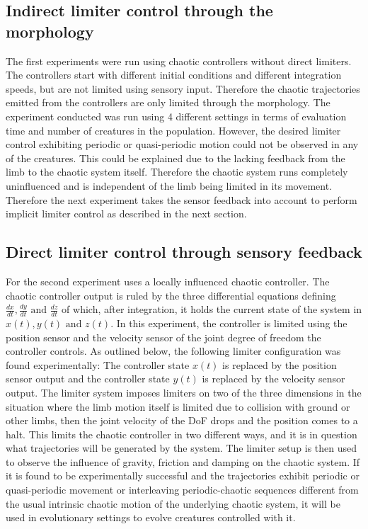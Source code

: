 \documentclass[main]{subfiles}
\begin{document}
\subsection{Indirect limiter control through the morphology}

The first experiments were run using chaotic controllers without direct limiters. The controllers start with different initial conditions and different integration speeds, but are not limited using sensory input. Therefore the chaotic trajectories emitted from the controllers are only limited through the morphology. The experiment conducted was run using 4 different settings in terms of evaluation time and number of creatures in the population. However, the desired limiter control exhibiting periodic or quasi-periodic motion could not be observed in any of the creatures. This could be explained due to the lacking feedback from the limb to the chaotic system itself. Therefore the chaotic system runs completely uninfluenced and is independent of the limb being limited in its movement. Therefore the next experiment takes the sensor feedback into account to perform implicit limiter control as described in the next section.

\subsection{Direct limiter control through sensory feedback}

For the second experiment uses a locally influenced chaotic controller. The chaotic controller output is ruled by the three differential equations defining \(\frac{dx}{dt},\frac{dy}{dt} \text{ and } \frac{dz}{dt}\) of which, after integration, it holds the current state of the system in \(x(t),y(t) \text{ and } z(t)\).  In this experiment, the controller is limited using the position sensor and the velocity sensor of the joint degree of freedom the controller controls. As outlined below, the following limiter configuration was found experimentally: The controller state \(x(t)\) is replaced by the position sensor output and the controller state \(y(t)\) is replaced by the velocity sensor output. The limiter system imposes limiters on two of the three dimensions in the situation where the limb motion itself is limited due to collision with ground or other limbs, then the joint velocity of the DoF drops and the position comes to a halt. This limits the chaotic controller in two different ways, and it is in question what trajectories will be generated by the system. The limiter setup is then used to observe the influence of gravity, friction and damping on the chaotic system. If it is found to be experimentally successful and the trajectories exhibit periodic or quasi-periodic movement or interleaving periodic-chaotic sequences different from the usual intrinsic chaotic motion of the underlying chaotic system, it will be used in evolutionary settings to evolve creatures controlled with it.
\end{document}
